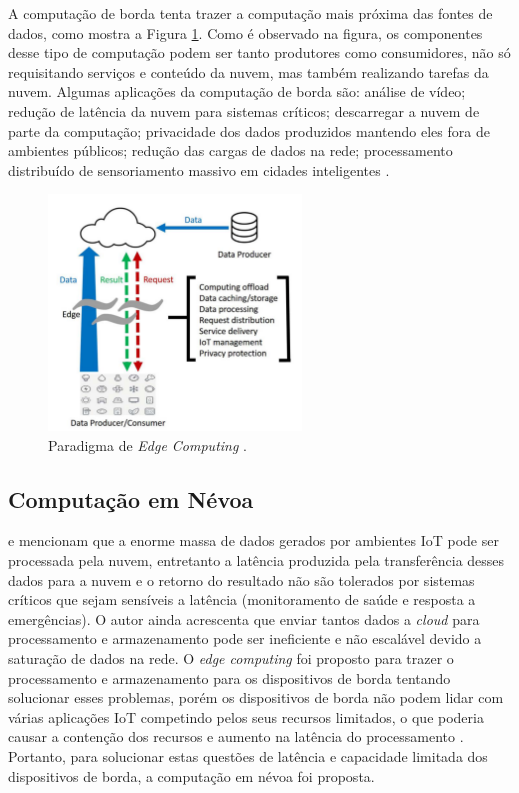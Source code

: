 A computação de borda tenta trazer a computação mais próxima das fontes de
dados, como mostra a Figura \ref{edge-computing}. Como é observado na figura, os
componentes desse tipo de computação podem ser tanto produtores como
consumidores, não só requisitando serviços e conteúdo da nuvem, mas também
realizando tarefas da nuvem.
Algumas aplicações da computação de borda são: análise de vídeo;
redução de latência da nuvem para sistemas críticos;
descarregar a nuvem de parte da computação;
privacidade dos dados produzidos mantendo eles fora de ambientes públicos;
redução das cargas de dados na rede;
processamento distribuído de sensoriamento massivo em cidades inteligentes \cite{Shi2016}.

\begin{figure}[ht]
\centering
\includegraphics[width=0.6\textwidth]{figuras/edge-computing.png}
\caption{Paradigma de \emph{Edge Computing} \cite{Shi2016}.}
\label{edge-computing}
\end{figure}

\subsection{Computação em Névoa}

 e 
mencionam que a enorme massa de dados gerados por ambientes IoT pode ser
processada pela nuvem, entretanto a latência produzida pela transferência desses
dados para a nuvem e o retorno do resultado não são tolerados por sistemas
críticos que sejam sensíveis a latência (monitoramento de saúde e resposta a
emergências). O autor ainda acrescenta que enviar tantos dados a \emph{cloud}
para processamento e armazenamento pode ser ineficiente e não escalável devido a
saturação de dados na rede. O \emph{edge computing} foi proposto para trazer o
processamento e armazenamento para os dispositivos de borda tentando solucionar
esses problemas, porém os dispositivos de borda não podem lidar com várias
aplicações IoT competindo pelos seus recursos limitados, o que poderia causar a
contenção dos recursos e aumento na latência do processamento
\cite{Dastjerdi2016}. Portanto, para solucionar estas questões de latência e
capacidade limitada dos dispositivos de borda, a computação em névoa foi proposta.

